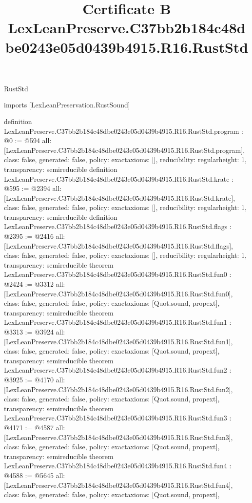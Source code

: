 \begin{lexlean}{RustStd}
\title{Certificate B LexLeanPreserve.C37bb2b184c48dbe0243e05d0439b4915.R16.RustStd}
\begin{coremodule}
imports [LexLeanPreservation.RustSound]

definition LexLeanPreserve.C37bb2b184c48dbe0243e05d0439b4915.R16.RustStd.program : @0 := @594 {
  all: [LexLeanPreserve.C37bb2b184c48dbe0243e05d0439b4915.R16.RustStd.program],
  class: false,
  generated: false,
  policy: exact{axioms: []},
  reducibility: regular{height: 1},
  transparency: semireducible
}
definition LexLeanPreserve.C37bb2b184c48dbe0243e05d0439b4915.R16.RustStd.krate : @595 := @2394 {
  all: [LexLeanPreserve.C37bb2b184c48dbe0243e05d0439b4915.R16.RustStd.krate],
  class: false,
  generated: false,
  policy: exact{axioms: []},
  reducibility: regular{height: 1},
  transparency: semireducible
}
definition LexLeanPreserve.C37bb2b184c48dbe0243e05d0439b4915.R16.RustStd.flags : @2395 := @2416 {
  all: [LexLeanPreserve.C37bb2b184c48dbe0243e05d0439b4915.R16.RustStd.flags],
  class: false,
  generated: false,
  policy: exact{axioms: []},
  reducibility: regular{height: 1},
  transparency: semireducible
}
theorem LexLeanPreserve.C37bb2b184c48dbe0243e05d0439b4915.R16.RustStd.fun0 : @2424 := @3312 {
  all: [LexLeanPreserve.C37bb2b184c48dbe0243e05d0439b4915.R16.RustStd.fun0],
  class: false,
  generated: false,
  policy: exact{axioms: [Quot.sound, propext]},
  transparency: semireducible
}
theorem LexLeanPreserve.C37bb2b184c48dbe0243e05d0439b4915.R16.RustStd.fun1 : @3313 := @3924 {
  all: [LexLeanPreserve.C37bb2b184c48dbe0243e05d0439b4915.R16.RustStd.fun1],
  class: false,
  generated: false,
  policy: exact{axioms: [Quot.sound, propext]},
  transparency: semireducible
}
theorem LexLeanPreserve.C37bb2b184c48dbe0243e05d0439b4915.R16.RustStd.fun2 : @3925 := @4170 {
  all: [LexLeanPreserve.C37bb2b184c48dbe0243e05d0439b4915.R16.RustStd.fun2],
  class: false,
  generated: false,
  policy: exact{axioms: [Quot.sound, propext]},
  transparency: semireducible
}
theorem LexLeanPreserve.C37bb2b184c48dbe0243e05d0439b4915.R16.RustStd.fun3 : @4171 := @4587 {
  all: [LexLeanPreserve.C37bb2b184c48dbe0243e05d0439b4915.R16.RustStd.fun3],
  class: false,
  generated: false,
  policy: exact{axioms: [Quot.sound, propext]},
  transparency: semireducible
}
theorem LexLeanPreserve.C37bb2b184c48dbe0243e05d0439b4915.R16.RustStd.fun4 : @4588 := @5645 {
  all: [LexLeanPreserve.C37bb2b184c48dbe0243e05d0439b4915.R16.RustStd.fun4],
  class: false,
  generated: false,
  policy: exact{axioms: [Quot.sound, propext]},
}
\end{coremodule}
\end{lexlean}
